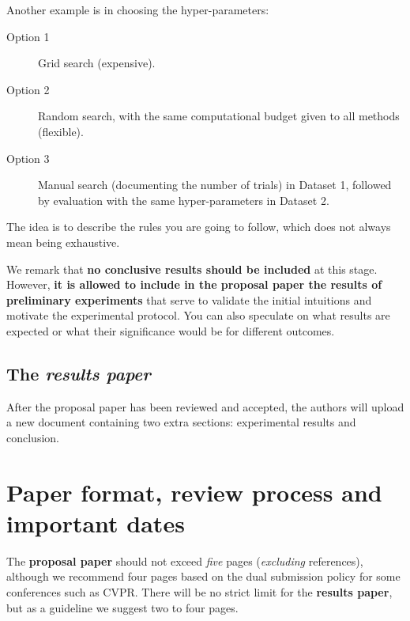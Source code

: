 \documentclass{article}
\begin{document}
Another example is in choosing the hyper-parameters:

\begin{description}
\item[Option 1] Grid search (expensive).
\item[Option 2] Random search, with the same computational budget given to all methods (flexible).
\item[Option 3] Manual search (documenting the number of trials) in Dataset 1, followed by evaluation with the same hyper-parameters in Dataset 2.
\end{description}

The idea is to describe the rules you are going to follow, which does not always mean being exhaustive.

We remark that \textbf{no conclusive results should be included} at this stage.
However, \textbf{it is allowed to include in the proposal paper the results of preliminary experiments} that serve to validate the initial intuitions and motivate the experimental protocol.
You can also speculate on what results are expected or what their significance would be for different outcomes.

\subsection{The \emph{results paper}}
\label{sec:post}
After the proposal paper has been reviewed and accepted, the authors will upload a new document containing two extra sections: experimental results and conclusion.

\section{Paper format, review process and important dates}


The \textbf{proposal paper} should not exceed \emph{five} pages (\emph{excluding} references),
although we recommend four pages based on the dual submission policy for some conferences such as CVPR.
There will be no strict limit for the \textbf{results paper}, but as a guideline we suggest two to four pages.
\end{document}
